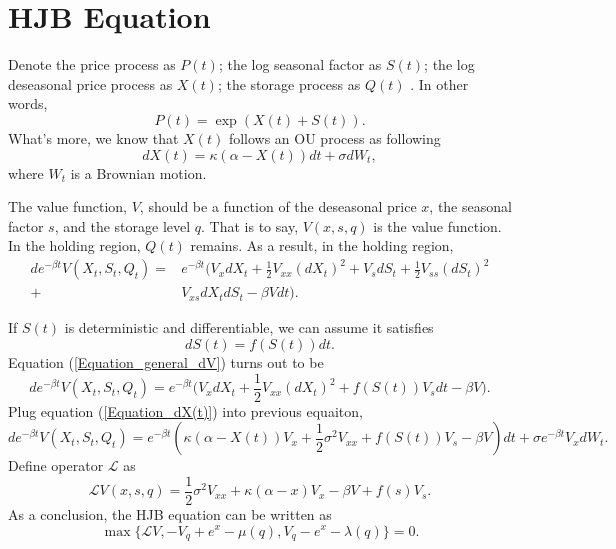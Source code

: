 \documentclass[paper=a4, fontsize=15pt]{scrartcl} %
\numberwithin{equation}{section} %
\numberwithin{figure}{section} %
\numberwithin{table}{section} %
\begin{document}

\section{HJB Equation}
Denote the price process as $P(t)$; the log seasonal factor as $S(t)$; the log deseasonal price process as $X(t)$; the storage process as $Q(t)$ . In other words, 
\begin{equation*}
  P(t) = \exp(X(t) + S(t)).
\end{equation*}
What's more, we know that $X(t)$ follows an OU process as following
\begin{equation}\label{Equation_dX(t)}
  dX(t) = \kappa(\alpha - X(t))dt + \sigma dW_t,
\end{equation}
where $W_t$ is a Brownian motion.


The value function, $V$, should be a function of the deseasonal price $x$, the seasonal factor $s$, and the storage level $q$. That is to say, $V(x,s,q)$ is the value function. In the holding region, $Q(t)$ remains. As a result, in the holding region, 
\begin{equation}\label{Equation_general_dV}
\begin{split}
  de^{-\beta t}V(X_t,S_t,Q_t) = &e^{-\beta t}\bigg(V_xdX_t + \frac{1}{2}V_{xx}(dX_t)^2 + V_sdS_t + \frac{1}{2}V_{ss}(dS_t)^2\\ 
  		+& V_{xs}dX_tdS_t - \beta V dt\bigg). 
\end{split}
\end{equation}

If $S(t)$ is deterministic and differentiable, we can assume it satisfies
\begin{equation*}
  dS(t) = f(S(t))dt.
\end{equation*}
Equation (\ref{Equation_general_dV}) turns out to be
\begin{equation*}
  de^{-\beta t} V(X_t,S_t,Q_t) = e^{-\beta t}\bigg(V_xdX_t + \frac{1}{2}V_{xx}(dX_t)^2 + f(S(t))V_sdt - \beta V\bigg).
\end{equation*}
Plug equation (\ref{Equation_dX(t)}) into previous equaiton, 
\begin{equation*}
  de^{-\beta t} V(X_t,S_t,Q_t) = e^{-\beta t}\left(\kappa(\alpha-X(t))V_x + \frac{1}{2}\sigma^2V_{xx} + f(S(t))V_s - \beta V\right)dt + \sigma e^{-\beta t}V_x dW_t.
\end{equation*}
Define operator $\mathcal{L}$ as
\begin{equation*}
  \mathcal{L} V(x,s,q) = \frac{1}{2} \sigma^2 V_{xx} + \kappa(\alpha - x) V_x - \beta V +f(s) V_s . 
\end{equation*}
As a conclusion, the HJB equation can be written as
\begin{equation*}
  \max \{\mathcal{L} V, -V_q + e^x - \mu(q), V_q -e^x - \lambda(q)\} = 0.
\end{equation*}
\end{document}

